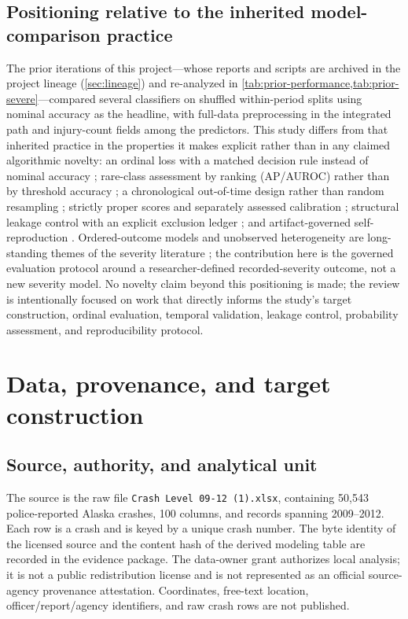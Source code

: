 \documentclass[11pt,letterpaper]{article}
\begin{document}
\subsection{Positioning relative to the inherited model-comparison practice}
The prior iterations of this project---whose reports and scripts are archived in the project lineage (\cref{sec:lineage}) and re-analyzed in \cref{tab:prior-performance,tab:prior-severe}---compared several classifiers on shuffled within-period splits using nominal accuracy as the headline, with full-data preprocessing in the integrated path and injury-count fields among the predictors. This study differs from that inherited practice in the properties it makes explicit rather than in any claimed algorithmic novelty: an ordinal loss with a matched decision rule instead of nominal accuracy \citep{frankhall2001,cohen1968}; rare-class assessment by ranking (AP/AUROC) rather than by threshold accuracy \citep{saito2015}; a chronological out-of-time design rather than random resampling \citep{roberts2017}; strictly proper scores and separately assessed calibration \citep{gneiting2007,guo2017,vancalster2019}; structural leakage control with an explicit exclusion ledger \citep{kaufman2012}; and artifact-governed self-reproduction \citep{pineau2021,nasem2019}. Ordered-outcome models and unobserved heterogeneity are long-standing themes of the severity literature \citep{savolainen2011,zhu2021}; the contribution here is the governed evaluation protocol around a researcher-defined recorded-severity outcome, not a new severity model. No novelty claim beyond this positioning is made; the review is intentionally focused on work that directly informs the study's target construction, ordinal evaluation, temporal validation, leakage control, probability assessment, and reproducibility protocol.

\section{Data, provenance, and target construction}
\subsection{Source, authority, and analytical unit}
The source is the raw file \texttt{Crash Level 09-12 (1).xlsx}, containing 50,543 police-reported Alaska crashes, 100 columns, and records spanning 2009--2012. Each row is a crash and is keyed by a unique crash number. The byte identity of the licensed source and the content hash of the derived modeling table are recorded in the evidence package. The data-owner grant authorizes local analysis; it is not a public redistribution license and is not represented as an official source-agency provenance attestation. Coordinates, free-text location, officer/report/agency identifiers, and raw crash rows are not published.
\end{document}
